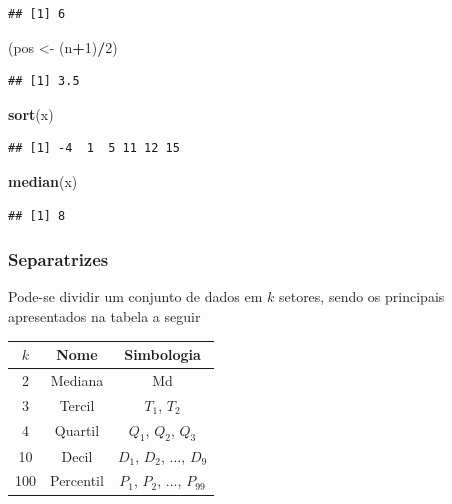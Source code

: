 \documentclass[
]{book}
\newenvironment{Shaded}{\begin{snugshade}}{\end{snugshade}}
\newcommand{\DecValTok}[1]{\textcolor[rgb]{0.00,0.00,0.81}{#1}}
\newcommand{\KeywordTok}[1]{\textcolor[rgb]{0.13,0.29,0.53}{\textbf{#1}}}
\newcommand{\NormalTok}[1]{#1}
\newcommand{\OperatorTok}[1]{\textcolor[rgb]{0.81,0.36,0.00}{\textbf{#1}}}
\newcommand{\StringTok}[1]{\textcolor[rgb]{0.31,0.60,0.02}{#1}}
\theoremstyle{definition}
\theoremstyle{definition}
\theoremstyle{definition}
\theoremstyle{remark}
\begin{document}
\begin{verbatim}
## [1] 6
\end{verbatim}

\begin{Shaded}
\begin{Highlighting}[]
\NormalTok{(pos \textless{}{-}}\StringTok{ }\NormalTok{(n}\OperatorTok{+}\DecValTok{1}\NormalTok{)}\OperatorTok{/}\DecValTok{2}\NormalTok{)}
\end{Highlighting}
\end{Shaded}

\begin{verbatim}
## [1] 3.5
\end{verbatim}

\begin{Shaded}
\begin{Highlighting}[]
\KeywordTok{sort}\NormalTok{(x)}
\end{Highlighting}
\end{Shaded}

\begin{verbatim}
## [1] -4  1  5 11 12 15
\end{verbatim}

\begin{Shaded}
\begin{Highlighting}[]
\KeywordTok{median}\NormalTok{(x)}
\end{Highlighting}
\end{Shaded}

\begin{verbatim}
## [1] 8
\end{verbatim}

\hypertarget{separatrizes-1}{%
\subsubsection*{Separatrizes}\label{separatrizes-1}}

Pode-se dividir um conjunto de dados em \(k\) setores, sendo os principais apresentados na tabela a seguir

\begin{longtable}[]{@{}ccc@{}}
\toprule
\(k\) & Nome & Simbologia\tabularnewline
\midrule
\endhead
2 & Mediana & Md\tabularnewline
3 & Tercil & \(T_1\), \(T_2\)\tabularnewline
4 & Quartil & \(Q_1\), \(Q_2\), \(Q_3\)\tabularnewline
10 & Decil & \(D_1\), \(D_2\), \(\ldots\), \(D_9\)\tabularnewline
100 & Percentil & \(P_1\), \(P_2\), \(\ldots\), \(P_{99}\)\tabularnewline
\bottomrule
\end{longtable}
\end{document}
